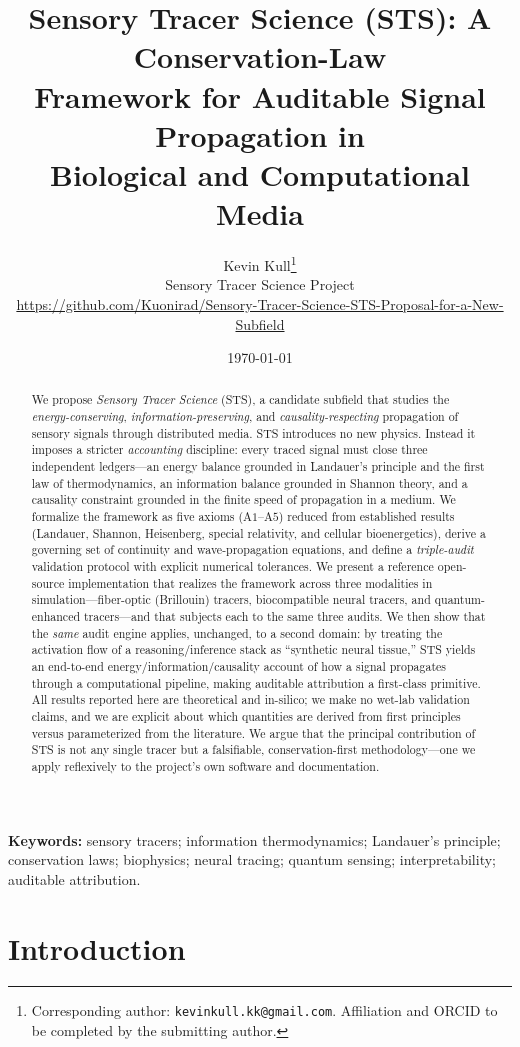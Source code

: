 \documentclass[11pt,a4paper]{article}
\title{\textbf{Sensory Tracer Science (STS): A Conservation-Law\\
Framework for Auditable Signal Propagation in\\
Biological and Computational Media}}
\author{%
  Kevin Kull\thanks{Corresponding author: \texttt{kevinkull.kk@gmail.com}.
  Affiliation and ORCID to be completed by the submitting author.}\\
  \small Sensory Tracer Science Project\\
  \small \url{https://github.com/Kuonirad/Sensory-Tracer-Science-STS-Proposal-for-a-New-Subfield}
}
\date{\today}
\begin{document}
\maketitle

\begin{abstract}
We propose \emph{Sensory Tracer Science} (STS), a candidate subfield that studies
the \emph{energy-conserving}, \emph{information-preserving}, and
\emph{causality-respecting} propagation of sensory signals through distributed
media. STS introduces no new physics. Instead it imposes a stricter
\emph{accounting} discipline: every traced signal must close three independent
ledgers---an energy balance grounded in Landauer's principle and the first law of
thermodynamics, an information balance grounded in Shannon theory, and a causality
constraint grounded in the finite speed of propagation in a medium. We formalize
the framework as five axioms ($\mathrm{A1}$--$\mathrm{A5}$) reduced from
established results (Landauer, Shannon, Heisenberg, special relativity, and
cellular bioenergetics), derive a governing set of continuity and wave-propagation
equations, and define a \emph{triple-audit} validation protocol with explicit
numerical tolerances. We present a reference open-source implementation that
realizes the framework across three modalities in simulation---fiber-optic
(Brillouin) tracers, biocompatible neural tracers, and quantum-enhanced
tracers---and that subjects each to the same three audits. We then show that the
\emph{same} audit engine applies, unchanged, to a second domain: by treating the
activation flow of a reasoning/inference stack as ``synthetic neural tissue,'' STS
yields an end-to-end energy/information/causality account of how a signal
propagates through a computational pipeline, making auditable attribution a
first-class primitive. All results reported here are theoretical and in-silico;
we make no wet-lab validation claims, and we are explicit about which quantities
are derived from first principles versus parameterized from the literature. We
argue that the principal contribution of STS is not any single tracer but a
falsifiable, conservation-first methodology---one we apply reflexively to the
project's own software and documentation.
\end{abstract}

\noindent\textbf{Keywords:} sensory tracers; information thermodynamics;
Landauer's principle; conservation laws; biophysics; neural tracing; quantum
sensing; interpretability; auditable attribution.

\section{Introduction}
\label{sec:intro}
\end{document}
